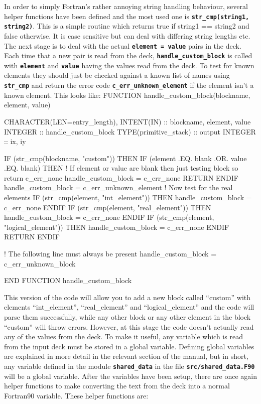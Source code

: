 \documentclass[12pt,a4paper]{article}
\newcommand{\inlinecode}[1]{{\color{warwickred} \bf\texttt{#1}}}
\newenvironment{boxverbatim}{\lboxverbatim{none}}{\endlboxverbatim}
\begin{document}
In order to simply Fortran's rather annoying string handling behaviour, several
helper functions have been defined and the most used one is
\inlinecode{str\_cmp(string1, string2)}. This is a simple routine which returns
true if string1 == string2 and false otherwise. It is case sensitive but can
deal with differing string lengths etc. The next stage is to deal with the
actual \inlinecode{element = value} pairs in the deck. Each time that a new pair
is read from the deck, \inlinecode{handle\_custom\_block} is called with
\inlinecode{element} and \inlinecode{value} having the values read from the
deck. To test for known elements they should just be checked against a known
list of names using \inlinecode{str\_cmp} and return the error code
\inlinecode{c\_err\_unknown\_element} if the element isn't a known element. This
looks like:
\begin{boxverbatim}
FUNCTION handle_custom_block(blockname, element, value)

  CHARACTER(LEN=entry_length), INTENT(IN) :: blockname, element, value
  INTEGER :: handle_custom_block
  TYPE(primitive_stack) :: output
  INTEGER :: ix, iy

  IF (str_cmp(blockname, "custom")) THEN
    IF (element .EQ. blank .OR. value .EQ. blank) THEN
      ! If element or value are blank then just testing block so return c_err_none
      handle_custom_block = c_err_none
      RETURN
    ENDIF
    handle_custom_block = c_err_unknown_element
    ! Now test for the real elements
    IF (str_cmp(element, "int_element")) THEN
      handle_custom_block = c_err_none
    ENDIF
    IF (str_cmp(element, "real_element")) THEN
      handle_custom_block = c_err_none
    ENDIF
    IF (str_cmp(element, "logical_element")) THEN
      handle_custom_block = c_err_none
    ENDIF
    RETURN
  ENDIF

  ! The following line must always be present
  handle_custom_block = c_err_unknown_block

END FUNCTION handle_custom_block
\end{boxverbatim}

This version of the code will allow you to add a new block called ``custom''
with elements\linebreak
``int\_element'', ``real\_element'' and ``logical\_element'' and the
code will parse them successfully, while any other block or any other element
in the block ``custom'' will throw errors. However, at this stage the code
doesn't actually read any of the values from the deck. To make it useful, any
variable which is read from the input deck must be stored in a global
variable. Defining global variables are explained in more detail in the
relevant section of the manual, but in short, any variable defined in the
module \inlinecode{shared\_data} in the file \inlinecode{src/shared\_data.F90}
will be a global variable. After the variables have been setup, there are once
again helper functions to make converting the text from the deck into a normal
Fortran90 variable. These helper functions are:
\end{document}
